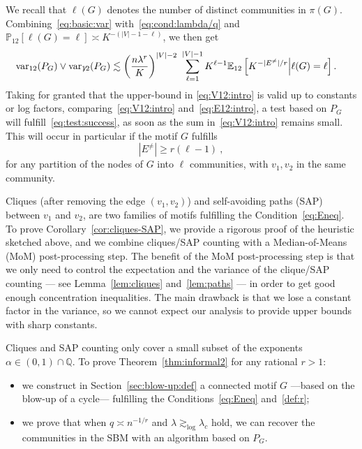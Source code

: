 \documentclass[final]{colt2026}
\newcommand{\1}{\mathbf{1}}
\newcommand{\bbE}{\mathbb{E}}
\newcommand{\bbP}{\mathbb{P}}
\newcommand{\pa}[1]{\left(#1\right)}
\newcommand{\cro}[1]{\left[#1\right]}
\begin{document}
We recall that $\ell(G)$ denotes the number of distinct communities in $\pi(G)$.
Combining~\eqref{eq:basic:var} with~\eqref{eq:cond:lambda/q} and $\bbP_{12}[\ell(G)=\ell]\asymp K^{-(|V|-1-\ell)}$, we then get
\begin{align}
\mathrm{var}_{12}(P_{G})\vee  \mathrm{var}_{\not 12}(P_{G})&\lesssim  \pa{n\lambda^r\over K}^{|V|-2}\ \sum_{\ell=1}^{|V|-1} K^{\ell-1} \bbE_{12}\cro{K^{-|E^{\neq}|/r}\Big|\ell(G)=\ell}. \label{eq:V12:intro}
\end{align}
Taking for granted that the upper-bound in \eqref{eq:V12:intro} is valid up to constants or log factors, comparing~\eqref{eq:V12:intro} and~\eqref{eq:E12:intro},  a test based on $P_{G}$ 
will fulfill~\eqref{eq:test:success}, as soon as the sum in~\eqref{eq:V12:intro} remains small. This will occur in particular if the motif $G$ fulfills 
\begin{equation}\label{eq:Eneq}
|E^{\neq}| \geq r(\ell-1)\ ,
\end{equation} 
for any partition of the nodes of $G$ into $\ell$ communities, with $v_{1},v_{2}$ in the same community.

Cliques (after removing the edge $(v_{1},v_{2})$) and self-avoiding paths (SAP) between $v_{1}$ and $v_{2}$, are two families of motifs fulfilling the Condition~\eqref{eq:Eneq}. 
To prove Corollary~\ref{cor:cliques-SAP}, we provide a rigorous proof of the heuristic sketched above, and  we combine cliques/SAP counting with a Median-of-Means (MoM) post-processing step. The benefit of the MoM post-processing step is that we only need to control the expectation and the variance of the clique/SAP counting --- see Lemma~\ref{lem:cliques} and~\ref{lem:paths} --- in order to get good enough concentration inequalities. The main drawback is that we lose a constant factor in the variance, so we cannot expect our analysis to provide upper bounds with sharp constants.

Cliques and SAP counting only  cover a small subset of the exponents $\alpha\in(0,1)\cap \mathbb{Q}$. 
To prove Theorem~\ref{thm:informal2} for any rational $r>1$: 
\begin{itemize}[wide, labelindent=2pt, nosep]\setlength{\itemsep}{0pt}
\item we construct in Section~\ref{sec:blow-up:def} a connected motif $G$ ---based on the blow-up of a cycle---  fulfilling the Conditions~\eqref{eq:Eneq} and~\eqref{def:r}; 
\item we prove that when  $q\asymp n^{-1/r}$  and $\lambda\gtrsim_{\log} \lambda_{c}$ hold, we can recover the communities in the SBM with an algorithm based on $P_{G}$.
\end{itemize}
\end{document}
